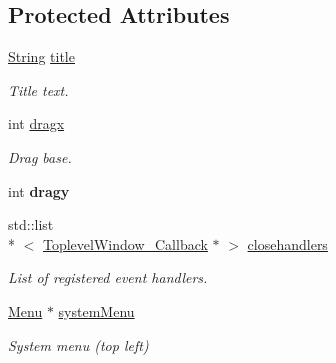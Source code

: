 \subsection*{Protected Attributes}
\begin{DoxyCompactItemize}
\item 
\hypertarget{classGUI_1_1ToplevelWindow_a04de191f9a57b5b584657866a4ac6843}{\hyperlink{classGUI_1_1String}{String} \hyperlink{classGUI_1_1ToplevelWindow_a04de191f9a57b5b584657866a4ac6843}{title}}\label{classGUI_1_1ToplevelWindow_a04de191f9a57b5b584657866a4ac6843}

\begin{DoxyCompactList}\small\item\em Title text. \end{DoxyCompactList}\item 
\hypertarget{classGUI_1_1ToplevelWindow_a5145cfb40dd82796956c89db53d84050}{int \hyperlink{classGUI_1_1ToplevelWindow_a5145cfb40dd82796956c89db53d84050}{dragx}}\label{classGUI_1_1ToplevelWindow_a5145cfb40dd82796956c89db53d84050}

\begin{DoxyCompactList}\small\item\em Drag base. \end{DoxyCompactList}\item 
\hypertarget{classGUI_1_1ToplevelWindow_a7582eb3db489f5ad6779f3cdff189077}{int {\bfseries dragy}}\label{classGUI_1_1ToplevelWindow_a7582eb3db489f5ad6779f3cdff189077}

\item 
\hypertarget{classGUI_1_1ToplevelWindow_a7417468e8e1869cd460e5e83753b34f4}{std\-::list\\*
$<$ \hyperlink{structGUI_1_1ToplevelWindow__Callback}{Toplevel\-Window\-\_\-\-Callback} $\ast$ $>$ \hyperlink{classGUI_1_1ToplevelWindow_a7417468e8e1869cd460e5e83753b34f4}{closehandlers}}\label{classGUI_1_1ToplevelWindow_a7417468e8e1869cd460e5e83753b34f4}

\begin{DoxyCompactList}\small\item\em List of registered event handlers. \end{DoxyCompactList}\item 
\hypertarget{classGUI_1_1ToplevelWindow_a40a88173ca1842f810d2093a43bacbc5}{\hyperlink{classGUI_1_1Menu}{Menu} $\ast$ \hyperlink{classGUI_1_1ToplevelWindow_a40a88173ca1842f810d2093a43bacbc5}{system\-Menu}}\label{classGUI_1_1ToplevelWindow_a40a88173ca1842f810d2093a43bacbc5}

\begin{DoxyCompactList}\small\item\em System menu (top left) \end{DoxyCompactList}\end{DoxyCompactItemize}


